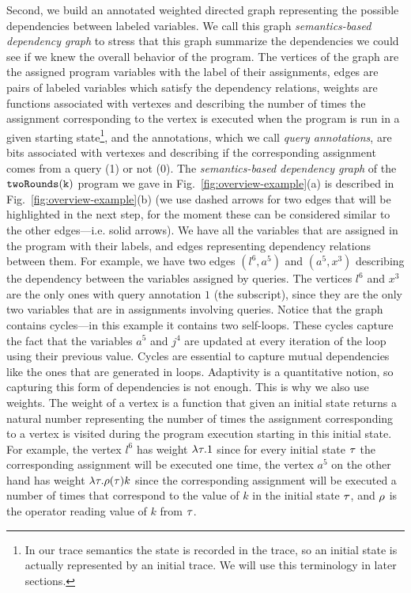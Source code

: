 Second, we build an annotated weighted directed graph representing the possible dependencies between labeled variables. We call this graph \emph{semantics-based dependency graph} to stress that this graph summarize the dependencies we could see if we knew the overall behavior of the program. 
The vertices of the graph are the assigned program variables with the label of their assignments, edges are pairs of labeled variables which satisfy the dependency relations, weights are functions associated with vertexes and describing the number of times the assignment corresponding to the vertex is executed when the program is run in a given starting state\footnote{In our trace semantics the state is recorded in the trace, so an initial state is actually represented by an initial trace. We will use this terminology in later sections.}, and the annotations, which we call \emph{query annotations}, are bits associated with vertexes and describing if the corresponding assignment comes from a query (1) or not (0).
The \emph{semantics-based dependency graph} of the $\mathtt{twoRounds(k)}$ program
we gave in Fig.~\ref{fig:overview-example}(a) is described in Fig.~\ref{fig:overview-example}(b) (we use dashed arrows for two edges that will be highlighted in the next step, for the moment these can be considered similar to the other edges---i.e. solid arrows). We have all the variables that are assigned in the program with their labels, and edges representing dependency relations between them. 
For example, we have two edges $(l^6, a^5)$ and $(a^5, x^3)$ describing the dependency between the variables assigned by queries. The vertices $l^6$ and $x^3$ are the only ones with query annotation $1$ (the subscript), since they are the only two variables that are in assignments involving  queries. Notice that the graph contains cycles---in this example it contains two self-loops. These cycles capture the fact that the variables $a^5$ and $j^4$ are updated at every iteration of the loop using their previous value. Cycles are essential to capture mutual dependencies like the ones that are generated in loops. Adaptivity is a quantitative notion, so capturing this form of dependencies is not enough. This is why we also use weights. The weight of a vertex is a function that given an initial state returns a natural number representing 
the number of times the assignment corresponding to a vertex is visited during the program execution starting in this initial state.  
For example, the vertex $l^{6}$ has weight {$\lambda \mathtt{\tau}.1$} since for every initial state {$\mathtt{\tau}$} the corresponding assignment will be executed one time, the vertex $a^5$ on the other hand has weight {$\lambda \mathtt{\tau}. \rho(\mathtt{\tau}) k$ since the corresponding assignment will be executed a number of times that correspond to the value of $k$ in the initial state $\mathtt{\tau}$, and $\rho$ is the operator reading value of $k$ from $\mathtt{\tau}$.
}

